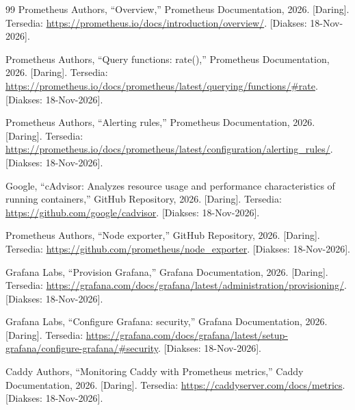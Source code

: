 \documentclass[a4paper,oneside,12pt]{report}
\begin{document}
\begin{thebibliography}{99}
Prometheus Authors, ``Overview,'' Prometheus Documentation, 2026. [Daring]. Tersedia: \url{https://prometheus.io/docs/introduction/overview/}. [Diakses: 18-Nov-2026].

Prometheus Authors, ``Query functions: rate(),'' Prometheus Documentation, 2026. [Daring]. Tersedia: \url{https://prometheus.io/docs/prometheus/latest/querying/functions/#rate}. [Diakses: 18-Nov-2026].

Prometheus Authors, ``Alerting rules,'' Prometheus Documentation, 2026. [Daring]. Tersedia: \url{https://prometheus.io/docs/prometheus/latest/configuration/alerting_rules/}. [Diakses: 18-Nov-2026].

Google, ``cAdvisor: Analyzes resource usage and performance characteristics of running containers,'' GitHub Repository, 2026. [Daring]. Tersedia: \url{https://github.com/google/cadvisor}. [Diakses: 18-Nov-2026].

Prometheus Authors, ``Node exporter,'' GitHub Repository, 2026. [Daring]. Tersedia: \url{https://github.com/prometheus/node_exporter}. [Diakses: 18-Nov-2026].

Grafana Labs, ``Provision Grafana,'' Grafana Documentation, 2026. [Daring]. Tersedia: \url{https://grafana.com/docs/grafana/latest/administration/provisioning/}. [Diakses: 18-Nov-2026].

Grafana Labs, ``Configure Grafana: security,'' Grafana Documentation, 2026. [Daring]. Tersedia: \url{https://grafana.com/docs/grafana/latest/setup-grafana/configure-grafana/#security}. [Diakses: 18-Nov-2026].

Caddy Authors, ``Monitoring Caddy with Prometheus metrics,'' Caddy Documentation, 2026. [Daring]. Tersedia: \url{https://caddyserver.com/docs/metrics}. [Diakses: 18-Nov-2026].
\end{thebibliography}
\end{document}
